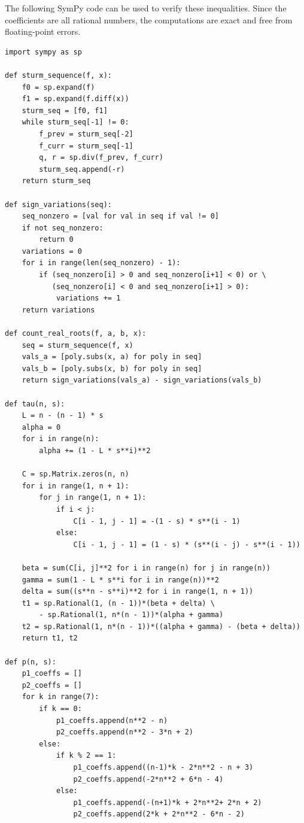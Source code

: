 \documentclass{article}
\theoremstyle{plain}
\theoremstyle{definition}
\theoremstyle{remark}
\begin{document}
The following SymPy code can be used to verify these inequalities. Since the coefficients are all rational numbers, the computations are exact and free from floating-point errors.

\begin{verbatim}
import sympy as sp

def sturm_sequence(f, x):
    f0 = sp.expand(f)
    f1 = sp.expand(f.diff(x))
    sturm_seq = [f0, f1]
    while sturm_seq[-1] != 0:
        f_prev = sturm_seq[-2]
        f_curr = sturm_seq[-1]
        q, r = sp.div(f_prev, f_curr)
        sturm_seq.append(-r)
    return sturm_seq

def sign_variations(seq):
    seq_nonzero = [val for val in seq if val != 0]
    if not seq_nonzero:
        return 0
    variations = 0
    for i in range(len(seq_nonzero) - 1):
        if (seq_nonzero[i] > 0 and seq_nonzero[i+1] < 0) or \
           (seq_nonzero[i] < 0 and seq_nonzero[i+1] > 0):
            variations += 1
    return variations

def count_real_roots(f, a, b, x):
    seq = sturm_sequence(f, x)
    vals_a = [poly.subs(x, a) for poly in seq]
    vals_b = [poly.subs(x, b) for poly in seq]
    return sign_variations(vals_a) - sign_variations(vals_b)

def tau(n, s):
    L = n - (n - 1) * s
    alpha = 0
    for i in range(n):
        alpha += (1 - L * s**i)**2

    C = sp.Matrix.zeros(n, n)
    for i in range(1, n + 1):
        for j in range(1, n + 1):
            if i < j:
                C[i - 1, j - 1] = -(1 - s) * s**(i - 1)
            else:
                C[i - 1, j - 1] = (1 - s) * (s**(i - j) - s**(i - 1))

    beta = sum(C[i, j]**2 for i in range(n) for j in range(n))
    gamma = sum(1 - L * s**i for i in range(n))**2
    delta = sum((s**n - s**i)**2 for i in range(1, n + 1))
    t1 = sp.Rational(1, (n - 1))*(beta + delta) \
        - sp.Rational(1, n*(n - 1))*(alpha + gamma)
    t2 = sp.Rational(1, n*(n - 1))*((alpha + gamma) - (beta + delta))
    return t1, t2

def p(n, s):
    p1_coeffs = []
    p2_coeffs = []
    for k in range(7):
        if k == 0:
            p1_coeffs.append(n**2 - n)
            p2_coeffs.append(n**2 - 3*n + 2)
        else:
            if k % 2 == 1:
                p1_coeffs.append((n-1)*k - 2*n**2 - n + 3)
                p2_coeffs.append(-2*n**2 + 6*n - 4)
            else:
                p1_coeffs.append(-(n+1)*k + 2*n**2+ 2*n + 2)
                p2_coeffs.append(2*k + 2*n**2 - 6*n - 2)


\end{verbatim}
\end{document}
